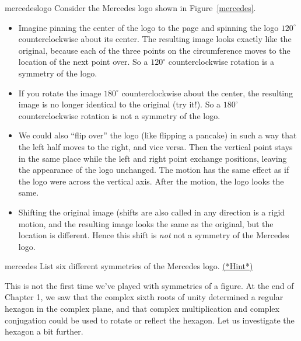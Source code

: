 \begin{example}{mercedeslogo} Consider the Mercedes logo shown in Figure~\ref{mercedes}.
\begin{itemize}
\item
Imagine pinning the center of the logo to the page and spinning the logo $120^\circ$ counterclockwise about its center. The resulting image looks exactly like the original, because each of the three points on the circumference moves  to the location of the next point over. So a $120^\circ$ counterclockwise rotation is a symmetry of the logo. 
\item
If you rotate the image $180^\circ$ counterclockwise about the center, the resulting image is no longer identical to the original (try it!).  So a $180^\circ$ counterclockwise rotation is not a symmetry of the logo.  
\item
We could also ``flip over'' the logo (like flipping a pancake) in such a way that the left half moves to the right, and vice versa.  Then the vertical point stays in the same place while the left and right point exchange positions, leaving the appearance of the logo unchanged. The motion has the same effect as if the logo were  across the vertical axis. After the motion, the logo looks the same. 
\item
Shifting  the original image (shifts are also called  in any direction is a rigid motion, and  the resulting image looks the same as the original, but the location is different.  Hence this shift is \emph{not} not a symmetry of the Mercedes logo.
\end{itemize}
\end{example}

\begin{exercise}{mercedes}
List six different symmetries of the Mercedes logo.
\hyperref[sec:symmetries:hints]{(*Hint*)}
\end{exercise}

This is not the first time we've played with symmetries of a figure.  At the end of Chapter 1, we saw that the complex sixth roots of unity determined a regular hexagon in the complex plane, and that complex multiplication and complex conjugation could be used to rotate or reflect the hexagon. 
Let us investigate the hexagon a bit further.

